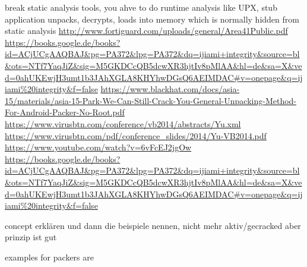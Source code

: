 break static analysis tools, you ahve to do runtime analysis\newline
like UPX, stub application unpacks, decrypts, loads into memory which is normally hidden from static analysis\newline
\url{http://www.fortiguard.com/uploads/general/Area41Public.pdf}\newline
\url{https://books.google.de/books?id=ACjUCgAAQBAJ\&pg=PA372\&lpg=PA372\&dq=ijiami+integrity\&source=bl\&ots=NTf7YaqJiZ\&sig=M5GKDCcQB5dcwXR3hjtIv8pMlAA\&hl=de\&sa=X\&ved=0ahUKEwjH3umt1b3JAhXGLA8KHYhwDGsQ6AEIMDAC\#v=onepage\&q=ijiami%20integrity\&f=false}\newline
\url{https://www.blackhat.com/docs/asia-15/materials/asia-15-Park-We-Can-Still-Crack-You-General-Unpacking-Method-For-Android-Packer-No-Root.pdf}\newline
\url{https://www.virusbtn.com/conference/vb2014/abstracts/Yu.xml}\newline
\url{https://www.virusbtn.com/pdf/conference_slides/2014/Yu-VB2014.pdf}\newline
\url{https://www.youtube.com/watch?v=6vFcEJ2jgOw}\newline
\url{https://books.google.de/books?id=ACjUCgAAQBAJ&pg=PA372&lpg=PA372&dq=ijiami+integrity&source=bl&ots=NTf7YaqJiZ&sig=M5GKDCcQB5dcwXR3hjtIv8pMlAA&hl=de&sa=X&ved=0ahUKEwjH3umt1b3JAhXGLA8KHYhwDGsQ6AEIMDAC#v=onepage&q=ijiami%20integrity&f=false}\newline

concept erklären und dann die beispiele nennen, nicht mehr aktiv/gecracked aber prinzip ist gut\newline

examples for packers are
